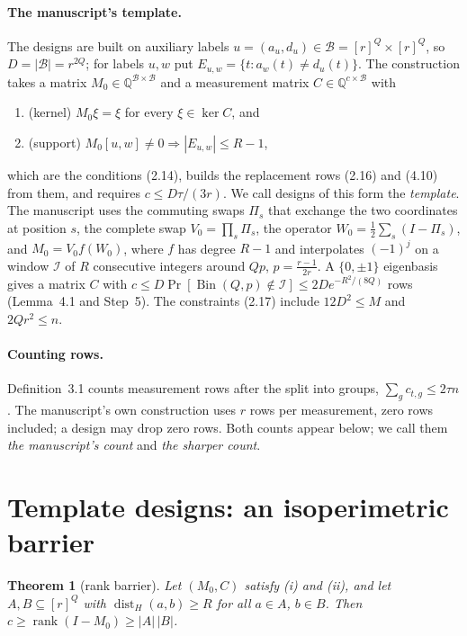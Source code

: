 \documentclass[11pt]{article}
\newtheorem{theorem}{Theorem}
\theoremstyle{definition}
\theoremstyle{remark}
\newcommand{\Q}{\mathbb{Q}}
\newcommand{\B}{\mathcal{B}}
\newcommand{\rank}{\operatorname{rank}}
\newcommand{\dist}{\operatorname{dist}}
\newcommand{\Bin}{\operatorname{Bin}}
\begin{document}
\paragraph{The manuscript's template.} The designs are built on auxiliary labels $u=(a_u,d_u)\in\B=[r]^Q\times[r]^Q$, so $D=|\B|=r^{2Q}$; for labels $u,w$ put $E_{u,w}=\{t:a_w(t)\ne d_u(t)\}$. The construction takes a matrix $M_0\in\Q^{\B\times\B}$ and a measurement matrix $C\in\Q^{c\times\B}$ with
\begin{enumerate}[label=(\roman*),leftmargin=2em]
\item (kernel) $M_0\xi=\xi$ for every $\xi\in\ker C$, and
\item (support) $M_0[u,w]\ne0\Rightarrow|E_{u,w}|\le R-1$,
\end{enumerate}
which are the conditions (2.14), builds the replacement rows (2.16) and (4.10) from them, and requires $c\le D\tau/(3r)$. We call designs of this form the \emph{template}. The manuscript uses the commuting swaps $\Pi_s$ that exchange the two coordinates at position $s$, the complete swap $V_0=\prod_s\Pi_s$, the operator $W_0=\frac12\sum_s(I-\Pi_s)$, and $M_0=V_0f(W_0)$, where $f$ has degree $R-1$ and interpolates $(-1)^j$ on a window $\mathcal I$ of $R$ consecutive integers around $Qp$, $p=\frac{r-1}{2r}$. A $\{0,\pm1\}$ eigenbasis gives a matrix $C$ with $c\le D\Pr[\Bin(Q,p)\notin\mathcal I]\le2De^{-R^2/(8Q)}$ rows (Lemma~4.1 and Step~5). The constraints (2.17) include $12D^2\le M$ and $2Qr^2\le n$.

\paragraph{Counting rows.} Definition~3.1 counts measurement rows after the split into groups, $\sum_gc_{t,g}\le2\tau n$. The manuscript's own construction uses $r$ rows per measurement, zero rows included; a design may drop zero rows. Both counts appear below; we call them \emph{the manuscript's count} and \emph{the sharper count}.

\section{Template designs: an isoperimetric barrier}\label{sec:single}

\begin{theorem}[rank barrier]\label{thm:barrier}
Let $(M_0,C)$ satisfy (i) and (ii), and let $A,B\subseteq[r]^Q$ with $\dist_H(a,b)\ge R$ for all $a\in A$, $b\in B$. Then $c\ge\rank(I-M_0)\ge|A|\,|B|$.
\end{theorem}
\end{document}
